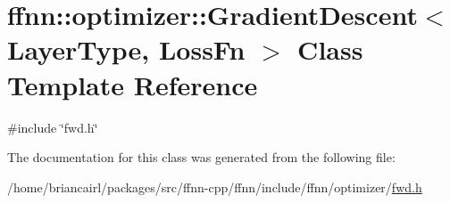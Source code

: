\hypertarget{classffnn_1_1optimizer_1_1_gradient_descent}{\section{ffnn\-:\-:optimizer\-:\-:Gradient\-Descent$<$ Layer\-Type, Loss\-Fn $>$ Class Template Reference}
\label{classffnn_1_1optimizer_1_1_gradient_descent}
}


{\ttfamily \#include \char`\"{}fwd.\-h\char`\"{}}



The documentation for this class was generated from the following file\-:\begin{DoxyCompactItemize}
\item 
/home/briancairl/packages/src/ffnn-\/cpp/ffnn/include/ffnn/optimizer/\hyperlink{fwd_8h}{fwd.\-h}\end{DoxyCompactItemize}
